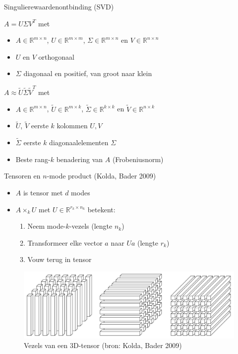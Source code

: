 \documentclass[t,12pt,dutch
\ifx\beamermode\undefined\else,\beamermode\fi
]{beamer}
\begin{document}
\begin{frame}{Singulierewaardenontbinding (SVD)}

$A = U \Sigma V^T$ met 
\begin{itemize}
\item $A \in \mathbb{R}^{m \times n}$, $U \in \mathbb{R}^{m \times m}$, $\Sigma \in \mathbb{R}^{m \times n}$ en $V \in \mathbb{R}^{n \times n}$
\item $U$ en $V$ orthogonaal
\item $\Sigma$ diagonaal en positief, van groot naar klein
\newline
\end{itemize}
$A \approx \widetilde{U} \widetilde{\Sigma} \widetilde{V}^T$ met 
\begin{itemize}
\item $A \in \mathbb{R}^{m \times n}$, $\widetilde{U} \in \mathbb{R}^{m \times k}$, $\widetilde{\Sigma} \in \mathbb{R}^{k \times k}$ en $\widetilde{V} \in \mathbb{R}^{n \times k}$
\item $\widetilde{U}$, $\widetilde{V}$ eerste $k$ kolommen $U, V$
\item $\widetilde{\Sigma}$ eerste $k$ diagonaalelementen $\Sigma$
\item Beste rang-$k$ benadering van $A$ (Frobeniusnorm)
\end{itemize}

\end{frame}

\begin{frame}{Tensoren en $n$-mode product (Kolda, Bader 2009)}

\begin{itemize}
\item $A$ is tensor met $d$ modes
\item $A \times_k U$ met $U \in \mathbb{R}^{r_k \times n_k}$ betekent:
\begin{enumerate}
\item Neem mode-$k$-vezels (lengte $n_k$)
\item Transformeer elke vector $a$ naar $Ua$ (lengte $r_k$)
\item Vouw terug in tensor
\end{enumerate}
\end{itemize}

\begin{figure}[H]
\centering
\includegraphics[scale=0.13]{images/fibers.png}
\caption{Vezels van een 3D-tensor (bron: Kolda, Bader 2009)}
\end{figure}

\end{frame}
\end{document}
